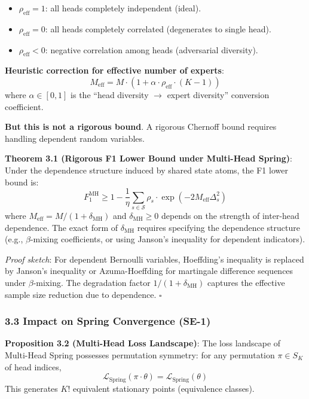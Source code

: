 \documentclass[
  12pt,
]{article}
\providecommand{\tightlist}{%
  \setlength{\itemsep}{0pt}\setlength{\parskip}{0pt}}
\begin{document}
\begin{itemize}
\tightlist
\item
  $\rho_{\text{eff}} = 1$: all heads completely independent (ideal).
\item
  $\rho_{\text{eff}} = 0$: all heads completely correlated (degenerates to single head).
\item
  $\rho_{\text{eff}} < 0$: negative correlation among heads (adversarial diversity).
\end{itemize}

\textbf{Heuristic correction for effective number of experts}:
\[M_{\text{eff}} = M \cdot (1 + \alpha \cdot \rho_{\text{eff}} \cdot (K - 1))\]
where $\alpha \in [0, 1]$ is the ``head diversity $\to$ expert diversity'' conversion coefficient.

\textbf{But this is not a rigorous bound}. A rigorous Chernoff bound requires handling dependent random variables.

\textbf{Theorem 3.1 (Rigorous F1 Lower Bound under Multi-Head Spring)}:
Under the dependence structure induced by shared state atoms, the F1 lower bound is:
\[\boxed{F_1^{\text{MH}} \geq 1 - \frac{1}{\eta} \sum_{s \in \mathcal{S}} \rho_s \cdot \exp\left(-2M_{\text{eff}} \Delta_s^2\right)}\]
where $M_{\text{eff}} = M / (1 + \delta_{\text{MH}})$ and $\delta_{\text{MH}} \geq 0$ depends on the strength of inter-head dependence. The exact form of $\delta_{\text{MH}}$ requires specifying the dependence structure (e.g., $\beta$-mixing coefficients, or using Janson's inequality for dependent indicators).

\emph{Proof sketch}: For dependent Bernoulli variables, Hoeffding's inequality is replaced by Janson's inequality or Azuma-Hoeffding for martingale difference sequences under $\beta$-mixing. The degradation factor $1/(1+\delta_{\text{MH}})$ captures the effective sample size reduction due to dependence. $\square$

\subsubsection{3.3 Impact on Spring Convergence (SE-1)}\label{impact-on-spring-convergence}

\textbf{Proposition 3.2 (Multi-Head Loss Landscape)}: The loss landscape of Multi-Head Spring possesses permutation symmetry: for any permutation $\pi \in S_K$ of head indices,
\[\mathcal{L}_{\text{Spring}}(\pi \cdot \theta) = \mathcal{L}_{\text{Spring}}(\theta)\]
This generates $K!$ equivalent stationary points (equivalence classes).
\end{document}
